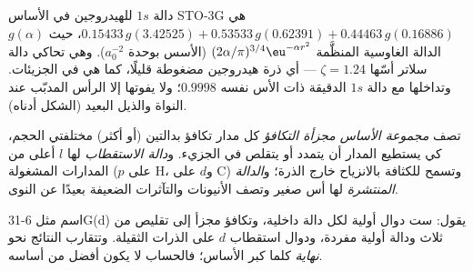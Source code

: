 \begin{example}\label{ex:b3:computational-chemistry:sto3g}
دالة $1s$ للهيدروجين في الأساس STO-3G هي $0.15433\,g(3.42525) + 0.53533\,
g(0.62391) + 0.44463\,g(0.16886)$، حيث $g(\alpha)$ الدالة الغاوسية المنظَّمة
$(2\alpha/\pi)^{3/4}\eu^{-\alpha r^2}$ (الأسس بوحدة $a_0^{-2}$). وهي تحاكي
دالة سلاتر أسّها $\zeta = 1.24$ --- أي ذرة هيدروجين مضغوطة
قليلًا، كما هي في الجزيئات. وتداخلها مع دالة $1s$ الدقيقة
ذات الأس نفسه $0.9998$؛ ولا يفوتها إلا الرأس المدبّب عند النواة والذيل
البعيد (الشكل أدناه).
\end{example}

\begin{definition}\label{def:b3:computational-chemistry:split-valence}
تصف \emph{مجموعة الأساس مجزأة التكافؤ} كل
مدار تكافؤ بدالتين (أو أكثر) مختلفتي الحجم، كي يستطيع
المدار أن يتمدد أو يتقلص في الجزيء. و\emph{دالة
الاستقطاب} لها $l$ أعلى من المدارات
المشغولة ($p$ على H، و$d$ على C) وتسمح للكثافة بالانزياح خارج الذرة؛ 
و\emph{الدالة المنتشرة} لها أس صغير 
وتصف الأنيونات والتآثرات الضعيفة بعيدًا عن النوى.
\end{definition}

اسم مثل 6-31G(d) يقول: ست دوال أولية لكل دالة داخلية، 
وتكافؤ مجزأ إلى تقليص من ثلاث ودالة أولية مفردة، ودوال
استقطاب $d$ على الذرات الثقيلة. وتتقارب النتائج نحو
\emph{نهاية } كلما كبر الأساس؛ فالحساب لا يكون أفضل من
أساسه.

